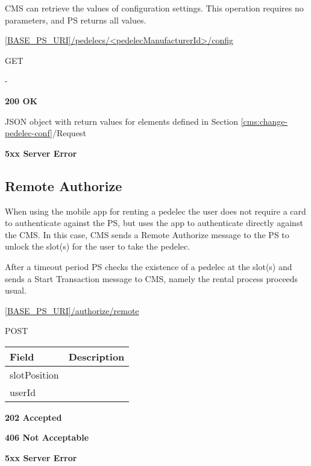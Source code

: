 \acs{CMS} can retrieve the values of configuration settings. This operation requires no parameters, and \acs{PS} returns all values.

 \url{[BASE_PS_URI]/pedelecs/<pedelecManufacturerId>/config}

 GET

 -

 \textbf{200 OK}

JSON object with return values for elements defined in Section \ref{cms:change-pedelec-conf}/Request

 \textbf{5xx Server Error}

\subsection{Remote Authorize}

When using the mobile app for renting a pedelec the user does not require a card to authenticate against the \acs{PS}, but uses the app to authenticate directly against the \acs{CMS}. In this case, \acs{CMS} sends a Remote Authorize message to the \acs{PS} to unlock the slot(s) for the user to take the pedelec. 

After a timeout period \acs{PS} checks the existence of a pedelec at the slot(s) and sends a Start Transaction message to \acs{CMS}, namely the rental process proceeds usual.


 \url{[BASE_PS_URI]/authorize/remote}

 POST

\begin{table}[!h]
\vspace{-7mm}
\begin{tabularx}{\linewidth}{ | l | X | }
  \hline
  \rowcolor{table-head}
  Field & Description \\
  \hline
  slotPosition 		&  \\
  userId		&  \\
  \hline
\end{tabularx}
\end{table}

 \textbf{202 Accepted}

 \textbf{406 Not Acceptable}

\textbf{5xx Server Error}

